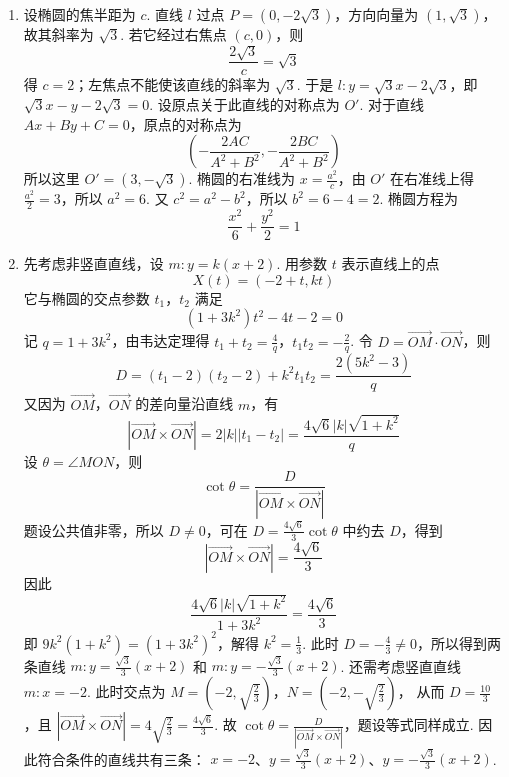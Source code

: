 \begin{solution}
\begin{enumerate}
\item 设椭圆的焦半距为 \(c\). 直线 \(l\) 过点 \(P=(0,-2\sqrt{3})\)，方向向量为 \((1,\sqrt{3})\)，故其斜率为 \(\sqrt{3}\). 若它经过右焦点 \((c,0)\)，则
\[
\frac{2\sqrt{3}}{c}=\sqrt{3}
\]
得 \(c=2\)；左焦点不能使该直线的斜率为 \(\sqrt{3}\). 于是
\(l:y=\sqrt{3}x-2\sqrt{3}\)，即 \(\sqrt{3}x-y-2\sqrt{3}=0\).
设原点关于此直线的对称点为 \(O'\). 对于直线 \(Ax+By+C=0\)，原点的对称点为
\[
\left(-\frac{2AC}{A^2+B^2},-\frac{2BC}{A^2+B^2}\right)
\]
所以这里 \(O'=(3,-\sqrt{3})\). 椭圆的右准线为 \(x=\frac{a^2}{c}\)，由 \(O'\) 在右准线上得
\(\frac{a^2}{2}=3\)，所以 \(a^2=6\).
又 \(c^2=a^2-b^2\)，所以 \(b^2=6-4=2\). 椭圆方程为
\[
\frac{x^2}{6}+\frac{y^2}{2}=1
\]
\item 先考虑非竖直直线，设 \(m:y=k(x+2)\). 用参数 \(t\) 表示直线上的点
\[
X(t)=(-2+t,kt)
\]
它与椭圆的交点参数 \(t_1\)，\(t_2\) 满足
\[
(1+3k^2)t^2-4t-2=0
\]
记 \(q=1+3k^2\)，由韦达定理得 \(t_1+t_2=\frac{4}{q}\)，\(t_1t_2=-\frac{2}{q}\).
令 \(D=\overrightarrow{OM}\cdot\overrightarrow{ON}\)，则
\[
D=(t_1-2)(t_2-2)+k^2t_1t_2
=\frac{2(5k^2-3)}{q}
\]
又因为 \(\overrightarrow{OM}\)，\(\overrightarrow{ON}\) 的差向量沿直线 \(m\)，有
\[
|\overrightarrow{OM}\times\overrightarrow{ON}|
=2|k||t_1-t_2|
=\frac{4\sqrt{6}|k|\sqrt{1+k^2}}{q}
\]
设 \(\theta=\angle MON\)，则
\[
\cot\theta=\frac{D}{|\overrightarrow{OM}\times\overrightarrow{ON}|}
\]
题设公共值非零，所以 \(D\ne0\)，可在 \(D=\frac{4\sqrt{6}}{3}\cot\theta\) 中约去 \(D\)，得到
\[
|\overrightarrow{OM}\times\overrightarrow{ON}|=\frac{4\sqrt{6}}{3}
\]
因此
\[
\frac{4\sqrt{6}|k|\sqrt{1+k^2}}{1+3k^2}=\frac{4\sqrt{6}}{3}
\]
即 \(9k^2(1+k^2)=(1+3k^2)^2\)，解得 \(k^2=\frac{1}{3}\). 此时 \(D=-\frac{4}{3}\ne0\)，所以得到两条直线
\(m:y=\frac{\sqrt{3}}{3}(x+2)\) 和 \(m:y=-\frac{\sqrt{3}}{3}(x+2)\).
还需考虑竖直直线 \(m:x=-2\). 此时交点为
\(M=\left(-2,\sqrt{\frac{2}{3}}\right)\)，\(N=\left(-2,-\sqrt{\frac{2}{3}}\right)\)，
从而
\(D=\frac{10}{3}\)，且 \(|\overrightarrow{OM}\times\overrightarrow{ON}|=4\sqrt{\frac{2}{3}}=\frac{4\sqrt{6}}{3}\).
故 \(\cot\theta=\frac{D}{|\overrightarrow{OM}\times\overrightarrow{ON}|}\)，题设等式同样成立. 因此符合条件的直线共有三条：
\(x=-2\)、\(y=\frac{\sqrt{3}}{3}(x+2)\)、\(y=-\frac{\sqrt{3}}{3}(x+2)\).
\end{enumerate}
\end{solution}


